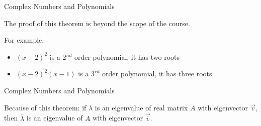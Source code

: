 \begin{frame}{Complex Numbers and Polynomials}


    \begin{center}\end{center}
    
    \vspace{12pt}
    The proof of this theorem is beyond the scope of the course. 
    \vspace{12pt}
    
    \pause
    
    For example,
    \begin{itemize}
        \item $(x-2)^2$ is a 2$^{nd}$ order polynomial, it has two roots 
        \item $(x-2)^2(x-1)$ is a $3^{rd}$ order polynomial, it has three roots
    \end{itemize}
\end{frame}




\begin{frame}{Complex Numbers and Polynomials}

    \begin{center}\end{center}
    
    \vspace{12pt}
    Because of this theorem: if $\lambda$ is an eigenvalue of real matrix $A$ with eigenvector $\vec v$, then $\overline{\lambda}$ is an eigenvalue of $A$ with eigenvector $\vec{\overline{v}}$.
    
 
      

\medskip



\end{frame}



